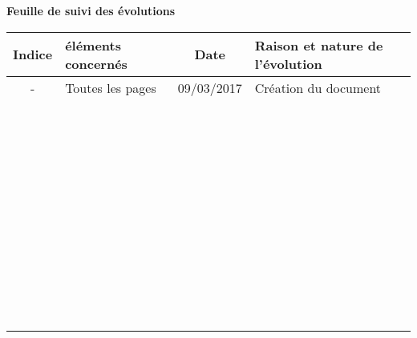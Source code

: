 \begin{center}\bfseries\Huge
    Feuille de suivi des évolutions
\end{center}
\begin{tabular}{|c|p{2.8cm}|c|p{9cm}|}
  \hline
  Indice & éléments concernés & Date & Raison et nature de l'évolution \\ \hline
  - & Toutes les pages & 09/03/2017 & Création du document\\
  &&&\\
  &&&\\
  &&&\\
  &&&\\
  &&&\\
  &&&\\
  &&&\\
  &&&\\
  &&&\\
  &&&\\
  &&&\\
  &&&\\
  &&&\\
  &&&\\
  &&&\\
  &&&\\
  &&&\\
  &&&\\
  &&&\\
  &&&\\
  &&&\\
  &&&\\
  &&&\\
  &&&\\
  &&&\\
  &&&\\
  &&&\\
  &&&\\
  &&&\\
  &&&\\
  &&&\\
  &&&\\
  &&&\\
  &&&\\
  &&&\\
  &&&\\
  &&&\\
  &&&\\
  &&&\\
  &&&\\
  &&&\\
  &&&\\
  &&&\\
  &&&\\
  &&&\\
  &&&\\
  &&&\\
  &&&\\ \hline
\end{tabular}
